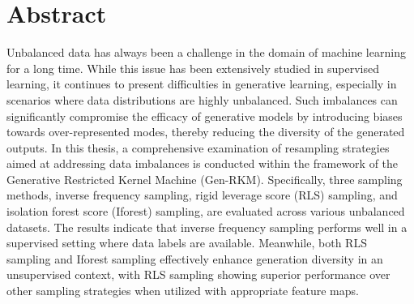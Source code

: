 \cleardoublepage
{}
{}
\chapter*{Abstract}
Unbalanced data has always been a challenge in the domain of machine learning for a long time. While this issue has been extensively studied in supervised learning, it continues to present difficulties in generative learning, especially in scenarios where data distributions are highly unbalanced. Such imbalances can significantly compromise the efficacy of generative models by introducing biases towards over-represented modes, thereby reducing the diversity of the generated outputs. In this thesis, a comprehensive examination of resampling strategies aimed at addressing data imbalances is conducted within the framework of the Generative Restricted Kernel Machine (Gen-RKM). Specifically, three sampling methods, inverse frequency sampling, rigid leverage score (RLS) sampling, and isolation forest score (Iforest) sampling, are evaluated across various unbalanced datasets. The results indicate that inverse frequency sampling performs well in a supervised setting where data labels are available. Meanwhile, both RLS sampling and Iforest sampling effectively enhance generation diversity in an unsupervised context, with RLS sampling showing superior performance over other sampling strategies when utilized with appropriate feature maps.  